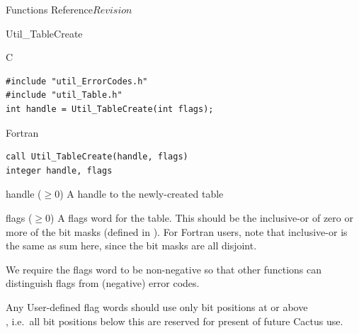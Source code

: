 \begin{cactuspart}{ Functions Reference}{}{$Revision$}
\begin{FunctionDescription}{Util\_TableCreate}
\begin{SynopsisSection}
\begin{Synopsis}{C}
\begin{verbatim}
#include "util_ErrorCodes.h"
#include "util_Table.h"
int handle = Util_TableCreate(int flags);
\end{verbatim}
\end{Synopsis}
\begin{Synopsis}{Fortran}
\begin{verbatim}
call Util_TableCreate(handle, flags)
integer handle, flags
\end{verbatim}
\end{Synopsis}
\end{SynopsisSection}

\begin{ResultSection}
\begin{Result}{handle ($\ge 0$)}
A handle to the newly-created table
\end{Result}
\end{ResultSection}

\begin{ParameterSection}
\begin{Parameter}{flags ($\ge 0$)}
A flags word for the table.  This should be the inclusive-or of zero
or more of the  bit masks (defined in
).  For Fortran users, note that inclusive-or
is the same as sum here, since the bit masks are all disjoint.
\end{Parameter}
\end{ParameterSection}

\begin{Discussion}
We require the flags word to be non-negative so that other
functions can distinguish flags from (negative) error codes.

Any User-defined flag words should use only bit positions at or above\\
, i.e.\ all bit positions
below this are reserved for present of future Cactus use.


\end{Discussion}
\end{FunctionDescription}
\end{cactuspart}
